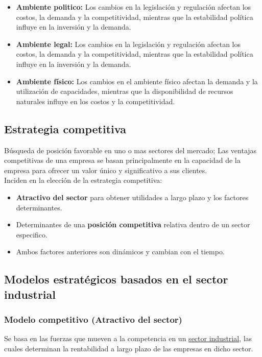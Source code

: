 \documentclass{templateNote}
\begin{document}
\begin{itemize}
        \item \textbf{Ambiente politico:} Los cambios en la legislación y regulación afectan los costos, la demanda y la competitividad, mientras que la estabilidad política influye en la inversión y la demanda.
        \item \textbf{Ambiente legal:} Los cambios en la legislación y regulación afectan los costos, la demanda y la competitividad, mientras que la estabilidad política influye en la inversión y la demanda.
        \item \textbf{Ambiente físico:} Los cambios en el ambiente físico afectan la demanda y la utilización de capacidades, mientras que la disponibilidad de recursos naturales influye en los costos y la competitividad.
    
    \end{itemize}


\subsection{Estrategia competitiva}
\noindent Búsqueda de posición favorable en uno o mas sectores del mercado; Las ventajas competitivas de una empresa se basan principalmente en la capacidad de la empresa para ofrecer un valor único y significativo a sus clientes. \\
Inciden en la elección de la estrategia competitiva:
\begin{itemize}
    \item \textbf{Atractivo del sector} para obtener utilidades a largo plazo y los factores determinantes.
    \item Determinantes de una \textbf{posición competitiva} relativa dentro de un sector especifico.
    \item Ambos factores anteriores son dinámicos y cambian con el tiempo.
\end{itemize}

\subsection{Modelos estratégicos basados en el sector industrial}

\subsubsection{Modelo competitivo (Atractivo del sector)}
\noindent Se basa en las fuerzas que mueven a la competencia en un \hyperlink{sec_ind}{sector industrial}, las cuales determinan la rentabilidad a largo plazo de las empresas en dicho sector.\\
\end{document}

